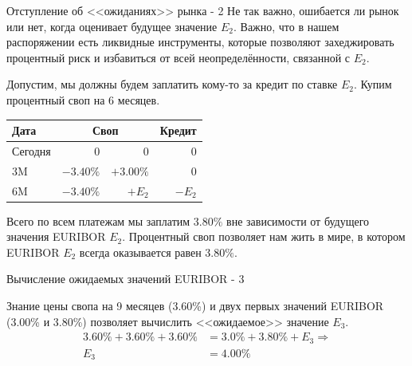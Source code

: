 \documentclass{beamer}
\begin{document}
\begin{frame}{Отступление об <<ожиданиях>> рынка - 2}
\justify
Не так важно, ошибается ли рынок или нет, когда оценивает будущее значение $E_2$. Важно, что в нашем распоряжении есть ликвидные инструменты, которые позволяют захеджировать процентный риск и избавиться от всей неопределённости, связанной с $E_2$.

\justify
Допустим, мы должны будем заплатить кому-то за кредит по ставке $E_2$. Купим процентный своп на 6 месяцев.

\centering
\begin{tabular}{l|r|r|r}
Дата    & \multicolumn{2}{c|}{Своп} & Кредит \\ \hline
Сегодня &          0  &  0            & 0 \\
3M      & $-3.40\%$  &  $+3.00\%$   & 0 \\
6M      & $-3.40\%$  &  $+E_2$       & $-E_2$
\end{tabular}

\justify
Всего по всем платежам мы заплатим $3.80\%$ вне зависимости от будущего значения EURIBOR $E_2$. Процентный своп позволяет нам жить в мире, в котором EURIBOR $E_2$ всегда оказывается равен $3.80\%$.
\end{frame}



\begin{frame}{Вычисление ожидаемых значений EURIBOR - 3}
\centering
{}

\justify
Знание цены свопа на 9 месяцев (3.60\%) и двух первых значений EURIBOR (3.00\% и 3.80\%) позволяет вычислить <<ожидаемое>> значение $E_3$.
\begin{align*}
3.60\% + 3.60\% + 3.60\% &= 3.0\% + 3.80\% + E_3 \Rightarrow \\
E_3 &= 4.00\%
\end{align*}
\end{frame}
\end{document}
